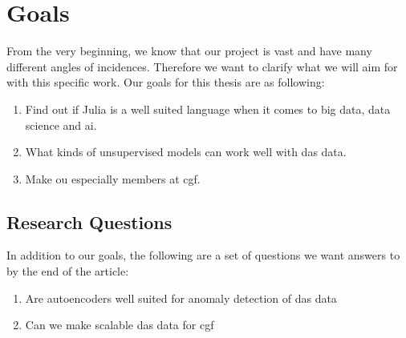 \section{Goals}

From the very beginning, we know that our project is vast and have many different angles of incidences. Therefore we want to clarify what we will aim for with this specific work.
Our goals for this thesis are as following: 

\begin{enumerate}
    \item Find out if Julia is a well suited language when it comes to big data, data science and \acrshort{ai}.
    \item What kinds of unsupervised models can work well with \acrshort{das} data.
    \item Make ou especially members at \acrshort{cgf}.
\end{enumerate}


\subsection{Research Questions}

In addition to our goals, the following are a set of questions we want answers to by the end of the article:

\begin{enumerate}
    \item Are autoencoders well suited for anomaly detection of das data
    \item Can we make scalable das data for cgf
\end{enumerate}
